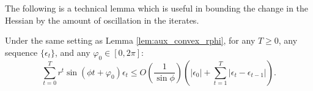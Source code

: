 The following is a technical lemma which is useful in bounding the change in 
the Hessian by the amount of oscillation in the iterates.
\begin{lemma}\label{lem:aux_convex_trigonometry}
Under the same setting as Lemma \ref{lem:aux_convex_rphi}, for any $T\ge 0$, any sequence $\{\epsilon_t\}$, and any $\varphi_0 \in [0, 2\pi]$:
\begin{equation*}
\sum_{t=0}^{T} r^t \sin(\phi t + \varphi_0) \epsilon_t
\le  O(\frac{1}{\sin\phi}) \left(|\epsilon_0|+  \sum_{t=1}^T |\epsilon_t - \epsilon_{t-1}|\right).
\end{equation*}
\end{lemma}

